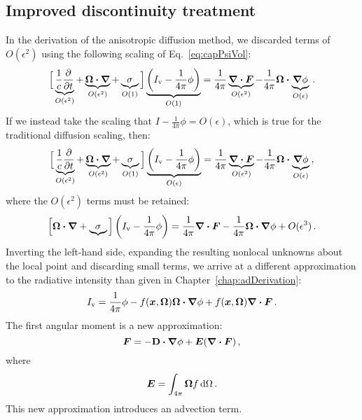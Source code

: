 \subsection{Improved discontinuity treatment}
In the derivation of the anisotropic diffusion method, we discarded
terms of $O(\epsilon^2)$ using the following scaling of Eq.~\eqref{eq:capPsiVol}:
\begin{equation*}
  \Big[ \underbrace{\frac{1}{c}\frac{\partial }{\partial t}}_{O(\epsilon^2)}
  + \underbrace{\bm{\Omega}\bm{\cdot} \bm{\nabla}}_{O(\epsilon^2)}
  + \underbrace{\sigma}_{O(1)} \Big]
   \underbrace{\left( I_\mathrm{v}
  - \frac{1}{4\pi} \phi \right)}_{O(1)}
  = \frac{1}{4\pi}  \underbrace{\bm{\nabla} \bm{\cdot}\bm{F}}_{O(\epsilon^2)} -
  \frac{1}{4\pi} \bm{\Omega}\bm{\cdot}  \underbrace{\bm{\nabla} \phi}_{O(\epsilon)}\,.
\end{equation*}
If we instead take the scaling that $I - \frac{1}{4\pi}\phi=
O(\epsilon)$, which is true for the traditional diffusion scaling, then:
\begin{equation*}
  \Big[ \underbrace{\frac{1}{c}\frac{\partial }{\partial t}}_{O(\epsilon^2)}
  + \underbrace{\bm{\Omega}\bm{\cdot} \bm{\nabla}}_{O(\epsilon^2)}
  + \underbrace{\sigma}_{O(1)} \Big]
   \underbrace{\left( I_\mathrm{v}
  - \frac{1}{4\pi} \phi \right)}_{O(\epsilon)}
  = \frac{1}{4\pi}  \underbrace{\bm{\nabla} \bm{\cdot}\bm{F}}_{O(\epsilon^2)} -
  \frac{1}{4\pi} \bm{\Omega}\bm{\cdot}  \underbrace{\bm{\nabla} \phi}_{O(\epsilon)}\,,
\end{equation*}
where the $O(\epsilon^2)$ terms must be retained:
\begin{equation*}
  \Big[ \bm{\Omega}\bm{\cdot} \bm{\nabla}
  + \underbrace{\sigma} \Big]
   \left( I_\mathrm{v} - \frac{1}{4\pi} \phi \right)
  = \frac{1}{4\pi}  \bm{\nabla} \bm{\cdot}\bm{F}
 - \frac{1}{4\pi} \bm{\Omega}\bm{\cdot}  \bm{\nabla} \phi + O(\epsilon^3)\,.
\end{equation*}
Inverting the left-hand side, expanding the resulting nonlocal unknowns about
the local point and discarding small terms, we arrive at a different
approximation to the radiative intensity than given in
Chapter~\ref{chap:adDerivation}:
\begin{equation*}
  I_\mathrm{v} = \frac{1}{4\pi} \phi - f(\bm{x},\bm{\Omega}) \bm{\Omega}\bm{\cdot}  \bm{\nabla} \phi 
  + f(\bm{x},\bm{\Omega})\bm{\nabla} \bm{\cdot}\bm{F} \,.
\end{equation*}
The first angular moment is a new approximation:
\begin{equation*}
  \bm{F} = - \mathbf{D} \bm{\cdot} \bm{\nabla} \phi + \bm{E} (\bm{\nabla} \bm{\cdot}\bm{F})\,,
\end{equation*}
where
\begin{equation*}
  \bm{E} = \int_{4\pi} \bm{\Omega} f \mathop{}\!\mathrm{d}\Omega\,.
\end{equation*}
This new approximation introduces an advection term.

